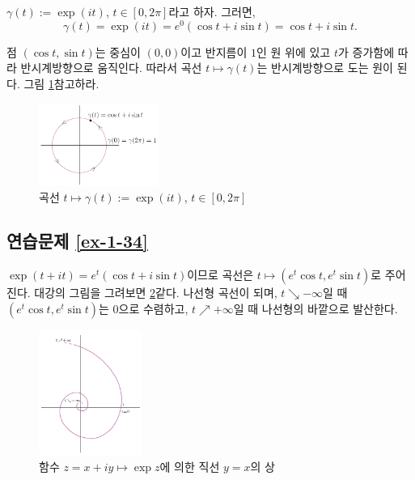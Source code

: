 $\gamma(t):= \exp(it)$, $t\in[0,2\pi]$라고 하자. 그러면,
\[
\gamma(t) = \exp(it) = e^0\left(\cos t + i\sin t\right) 
= \cos t + i\sin t.
\]

점 $(\cos t, \sin t)$는 중심이 $(0,0)$이고 반지름이 $1$인 원 위에 있고
$t$가 증가함에 따라 반시계방향으로 움직인다.
따라서 곡선 $t\mapsto \gamma(t)$는 반시계방향으로 도는 원이 된다.
그림 \ref{fig-5-12}\를 참고하라.

\begin{figure}[h!]
\begin{center}
\includegraphics[width=0.35\textwidth]{./Solution/figs/fig-5-12}
\end{center}
\caption{곡선 $t\mapsto \gamma(t):=\exp(it)$, $t\in[0,2\pi]$
}
\label{fig-5-12}
\end{figure}

\subsection*{연습문제 \ref{ex-1-34}}

$\exp(t+it) = e^t(\cos t + i\sin t)$이므로
곡선은 $t\mapsto (e^t\cos t, e^t\sin t)$로 주어진다.
대강의 그림을 그려보면 \ref{fig-5-13}\와 같다.
나선형 곡선이 되며, $t\searrow -\infty$일 때
$(e^t\cos t, e^t\sin t)$는 $0$으로 수렴하고,
$t\nearrow +\infty$일 때 나선형의 바깥으로 발산한다.

\begin{figure}[h!]
\begin{center}
\includegraphics[width=0.3\textwidth]{./Solution/figs/fig-5-13}
\end{center}
\caption{함수 $z=x+iy \mapsto \exp z$에 의한 직선 $y=x$의 상
}
\label{fig-5-13}
\end{figure}

